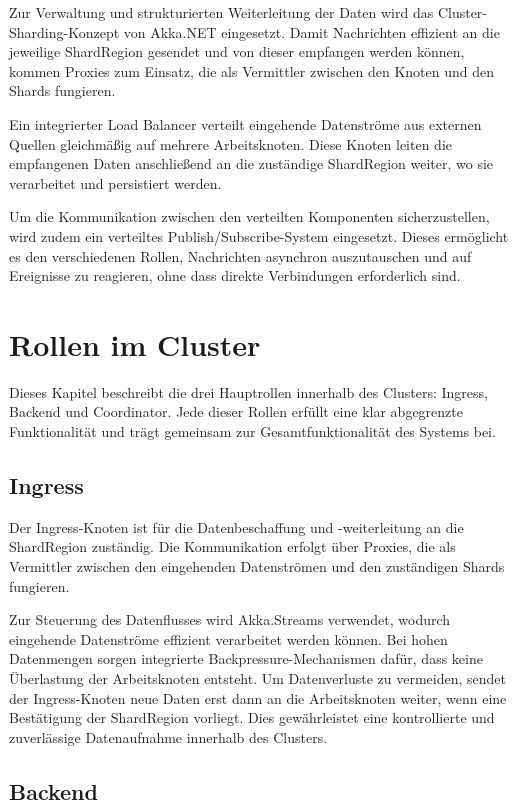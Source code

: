 Zur Verwaltung und strukturierten Weiterleitung der Daten wird das Cluster-Sharding-Konzept von Akka.NET eingesetzt.
Damit Nachrichten effizient an die jeweilige ShardRegion gesendet und von dieser empfangen werden können, kommen Proxies zum Einsatz, die als Vermittler zwischen den Knoten und den Shards fungieren.

Ein integrierter Load Balancer verteilt eingehende Datenströme aus externen Quellen gleichmäßig auf mehrere Arbeitsknoten.
Diese Knoten leiten die empfangenen Daten anschließend an die zuständige ShardRegion weiter, wo sie verarbeitet und persistiert werden.

Um die Kommunikation zwischen den verteilten Komponenten sicherzustellen, wird zudem ein verteiltes Publish/Subscribe-System eingesetzt.
Dieses ermöglicht es den verschiedenen Rollen, Nachrichten asynchron auszutauschen und auf Ereignisse zu reagieren, ohne dass direkte Verbindungen erforderlich sind.


\section{Rollen im Cluster}

Dieses Kapitel beschreibt die drei Hauptrollen innerhalb des Clusters: Ingress, Backend und Coordinator.
Jede dieser Rollen erfüllt eine klar abgegrenzte Funktionalität und trägt gemeinsam zur Gesamtfunktionalität des Systems bei.

\subsection{Ingress}

Der Ingress-Knoten ist für die Datenbeschaffung und -weiterleitung an die ShardRegion zuständig.
Die Kommunikation erfolgt über Proxies, die als Vermittler zwischen den eingehenden Datenströmen und den zuständigen Shards fungieren.

Zur Steuerung des Datenflusses wird Akka.Streams verwendet, wodurch eingehende Datenströme effizient verarbeitet werden können.
Bei hohen Datenmengen sorgen integrierte Backpressure-Mechanismen dafür, dass keine Überlastung der Arbeitsknoten entsteht.
Um Datenverluste zu vermeiden, sendet der Ingress-Knoten neue Daten erst dann an die Arbeitsknoten weiter, wenn eine Bestätigung der ShardRegion vorliegt.
Dies gewährleistet eine kontrollierte und zuverlässige Datenaufnahme innerhalb des Clusters.

\subsection{Backend}

